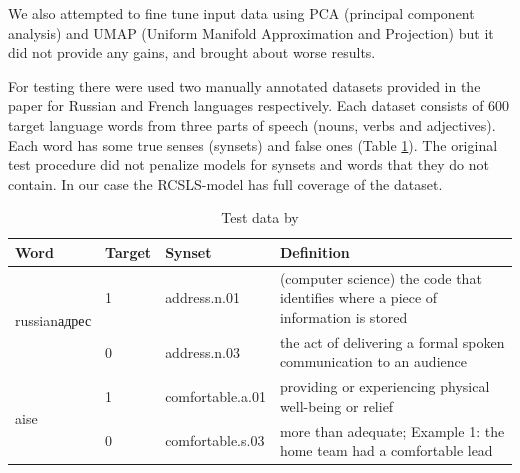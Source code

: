 \documentclass[11pt,a4paper]{article}
\begin{document}
We also attempted to fine tune input data using PCA (principal component analysis) and UMAP (Uniform Manifold Approximation and Projection) \cite{umap} but it did not provide any gains, and brought about worse results.

For testing there were used two manually annotated datasets provided in the paper \cite{Khodak2017} for Russian and French languages respectively. Each dataset consists of 600 target language words from three parts of speech (nouns, verbs and adjectives). Each word has some true senses (synsets) and false ones (Table \ref{wordnet-test-data}). The original test procedure did not penalize models for synsets and words that they do not contain. In our case the RCSLS-model has full coverage of the dataset.

\begin{table}[!htbp]
	\small
	\caption{Test data by \cite{Khodak2017}}
	\label{wordnet-test-data}		
	\centering
	\begin{tabular}{l l l l}
		\hline
		Word & Target &  Synset & Definition \\ \hline
		\multirow{2}{*}{\begin{otherlanguage*}{russian}адрес \end{otherlanguage*}}
		& \multicolumn{1}{l}{1} & \multicolumn{1}{l}{address.n.01} & \multicolumn{1}{l}{(computer science) the code that identifies where a piece of information is stored} \\
		& \multicolumn{1}{l}{0} & \multicolumn{1}{l}{address.n.03} & \multicolumn{1}{l}{the act of delivering a formal spoken communication to an audience} \\
		\hline
		\multirow{2}{*}{aise}
		& \multicolumn{1}{l}{1} & \multicolumn{1}{l}{comfortable.a.01} & \multicolumn{1}{l}{providing or experiencing physical well-being or relief} \\
		& \multicolumn{1}{l}{0} & \multicolumn{1}{l}{comfortable.s.03} & \multicolumn{1}{l}{more than adequate; Example 1: the home team had a comfortable lead} \\
		\hline
	\end{tabular}
	
\end{table}
\end{document}
